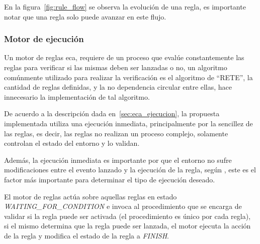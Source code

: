 En la figura~\ref{fig:rule_flow} se observa la evolución de una regla, es
importante notar que una regla solo puede avanzar en este flujo.

\subsubsection{Motor de ejecución}

Un motor de reglas \gls{eca}, requiere de un proceso que evalúe constantemente
las reglas para verificar si las mismas deben ser lanzadas o
no\cite{bailey2004event,galton2002two}, un algoritmo comúnmente utilizado para
realizar la verificación es el algoritmo de \enquote{RETE}\cite{de2001eca}, la
cantidad de reglas definidas, y la no dependencia circular entre ellas, hace
innecesario la implementación de tal algoritmo\cite{de2001eca}. 

De acuerdo a la descripción dada en~\ref{sec:eca_ejecucion}, la propuesta
implementada utiliza una ejecución inmediata, principalmente por la sencillez
de las reglas, es decir, las reglas no realizan un proceso complejo, solamente
controlan el estado del entorno y lo validan.

Además, la ejecución inmediata es importante por que el entorno no sufre
modificaciones entre el evento lanzado y la ejecución de la regla, según
\cite{bailey2004event}, este es el factor más importante para determinar el tipo
de ejecución deseado.

El motor de reglas actúa sobre aquellas reglas en estado
\emph{WAITING\_FOR\_CONDITION} e invoca al procedimiento que se encarga de
validar si la regla puede ser activada (el procedimiento es único por cada
regla), si el mismo determina que la regla puede ser lanzada, el motor ejecuta
la acción de la regla y modifica el estado de la regla a \emph{FINISH}.

